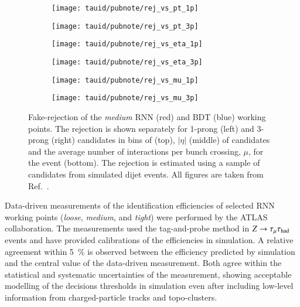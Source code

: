 \begin{figure}[htbp]

  \begin{subfigure}{0.498\textwidth}
    \texttt{[image: tauid/pubnote/rej\_vs\_pt\_1p]}
    \subcaption{}%
    \label{fig:tauid_faketau_rej_a}
  \end{subfigure}\hfill%
  \begin{subfigure}{0.498\textwidth}
    \texttt{[image: tauid/pubnote/rej\_vs\_pt\_3p]}
    \subcaption{}%
    \label{fig:tauid_faketau_rej_b}
  \end{subfigure}

  \begin{subfigure}{0.498\textwidth}
    \texttt{[image: tauid/pubnote/rej\_vs\_eta\_1p]}
    \subcaption{}
  \end{subfigure}\hfill%
  \begin{subfigure}{0.498\textwidth}
    \texttt{[image: tauid/pubnote/rej\_vs\_eta\_3p]}
    \subcaption{}
  \end{subfigure}

  \begin{subfigure}{0.498\textwidth}
    \texttt{[image: tauid/pubnote/rej\_vs\_mu\_1p]}
    \subcaption{}%
    \label{fig:tauid_faketau_rej_e}
  \end{subfigure}\hfill%
  \begin{subfigure}{0.498\textwidth}
    \texttt{[image: tauid/pubnote/rej\_vs\_mu\_3p]}
    \subcaption{}%
    \label{fig:tauid_faketau_rej_f}
  \end{subfigure}

  \caption{Fake-\tauhadvis rejection of the \emph{medium} RNN (red)
    and BDT (blue) \tauid working points. The rejection is shown
    separately for 1-prong (left) and 3-prong (right) \tauhadvis
    candidates in bins of \pT (top), $|\eta|$ (middle) of \tauhadvis
    candidates and the average number of interactions per bunch
    crossing, $\mu$, for the event (bottom). The rejection is
    estimated using a sample of \tauhadvis candidates from simulated
    dijet events. All figures are taken from
    Ref.~\cite{ATL-PHYS-PUB-2019-033}.}%
  \label{fig:tauid_faketau_rej}
\end{figure}

Data-driven measurements of the \truetauhadvis identification
efficiencies of selected RNN \tauid working points (\emph{loose},
\emph{medium}, and \emph{tight}) were performed by the ATLAS
collaboration. The measurements used the tag-and-probe method in
$Z \to \tau_\mu \tau_{\text{had}}$ events and have provided calibrations of the
\truetauhadvis efficiencies in simulation. A relative agreement within
\SI{5}{\percent} is observed between the efficiency predicted by
simulation and the central value of the data-driven measurement. Both
agree within the statistical and systematic uncertainties of the
measurement, showing acceptable modelling of the \tauid decisions
thresholds in simulation even after including low-level information
from charged-particle tracks and topo-clusters.

